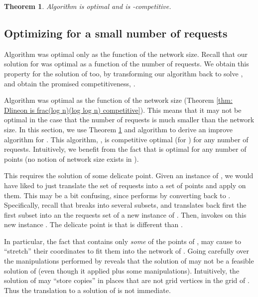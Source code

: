 \documentclass[11pt]{article}
\newtheorem{theorem}{Theorem}[section]
\begin{document}
\begin{theorem}
Algorithm  is optimal and is -competitive.
\label{thm: onRSA}
\end{theorem}












\subsection{Optimizing  for a small number of requests}
\label{sec:Optimal-mcd-for-few-requests}
Algorithm  was optimal only as the function of the network size.
Recall that our solution for  was optimal as a function of the number of requests.
We obtain this property for the solution of  too, by   transforming our  algorithm back to solve , and obtain the promised competitiveness,
 .



Algorithm  was optimal as the function of the network size (Theorem \ref{thm: Dlineon is frac(log n)(log log n) competitive}).
This means that it may not be optimal in the case that the number of requests is much smaller than the network size. In this section, we use Theorem \ref{thm: onRSA} and algorithm  to derive an improve algorithm for . This algorithm, , is competitive optimal (for ) for any number of requests.
Intuitively, we benefit from the fact that  is optimal for any number of points (no notion of network size exists in ).

This requires the solution of some delicate point. Given an instance  of , we would have liked to just translate the set  of  requests into a set  of  points and
apply  on them.
This may be a bit confusing, since  performs by converting back to .
Specifically,
recall that
  breaks  into several subsets, and translates back first the first subset  into an the requests set  of a new instance
  of .
Then,  invokes   on this new instance .
The delicate point is that  is different than .

In particular, the fact that  contains only {\em some} of the points of , may cause  to ``stretch'' their  coordinates to fit them into the network of .
Going carefully over the manipulations performed by 
reveals that the solution of  may not be a feasible solution
of  (even though it applied  plus some manipulations).
Intuitively, the solution of 
  may ``store copies'' in places that are not grid vertices in the grid of . Thus the translation to a solution of  is not immediate.
\end{document}

